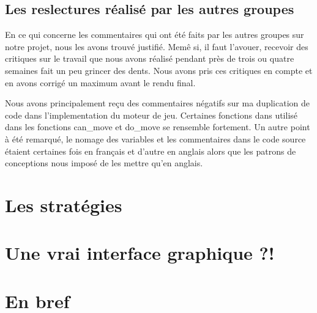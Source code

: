 \documentclass[12pt]{article}
\begin{document}
\subsection{Les reslectures r\'ealis\'e par les autres groupes}
\label{notre_etude}
En ce qui concerne les commentaires qui ont \'et\'e faits par les autres groupes
sur notre projet, nous les avons trouv\'e justifi\'e. Mem\^e si, il faut
l'avouer, recevoir des \og critiques \fg{} sur le travail que nous avons
r\'ealis\'e pendant pr\`es de trois ou quatre semaines fait un peu grincer des
dents. Nous avons pris ces critiques en compte et en avons corrig\'e un
maximum avant le rendu final. 
\par Nous avons principalement reçu des commentaires n\'egatifs sur ma
duplication de code dans l'implementation du moteur de jeu. Certaines fonctions
dans utilis\'e dans les fonctions \og can\_move \fg{} et \og do\_move \fg{} se
rensemble fortement. Un autre point \`a \'et\'e remarqu\'e, le nomage des
variables et les commentaires dans le code source \'etaient certaines fois en
français et d'autre en anglais alors que les patrons de conceptions nous
impos\'e de les mettre qu'en anglais.

\newpage
\section{Les strat\'egies}

\newpage
\section{Une vrai interface graphique ?!}

\newpage
\section{En bref}

\newpage



\newpage
\end{document}
